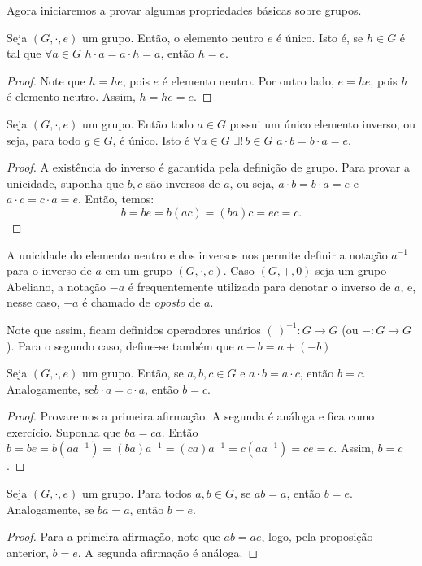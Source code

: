 Agora iniciaremos a provar algumas propriedades básicas sobre grupos.
\begin{prop}
    Seja $(G,\cdot,e)$ um grupo.
    Então, o elemento neutro $e$ é único.
    Isto é, se $h \in G$ é tal que $\forall a \in G$ $h \cdot a = a \cdot h = a$, então $h = e$.
\end{prop}
\begin{proof}
    Note que $h=he$, pois $e$ é elemento neutro.
    Por outro lado, $e=he$, pois $h$ é elemento neutro.
    Assim, $h=he=e$.
\end{proof}

\begin{prop}\label{prop:inverso_unico_grupo}
    Seja $(G,\cdot,e)$ um grupo.
    Então todo $a \in G$ possui um único elemento inverso, ou seja, para todo $g \in G$,  é único.
Isto é $\forall a \in G$ $\exists!\, b \in G$ $a \cdot b = b \cdot a = e$.
\end{prop}
\begin{proof}
    A existência do inverso é garantida pela definição de grupo.
    Para provar a unicidade, suponha que $b, c$ são inversos de $a$, ou seja, $a \cdot b = b \cdot a = e$ e $a \cdot c = c \cdot a = e$.
    Então, temos:
    $$b=be=b(ac)=(ba)c=ec=c.$$
\end{proof}

A unicidade do elemento neutro e dos inversos nos permite definir a notação $a^{-1}$ para o inverso de $a$ em um grupo $(G,\cdot,e)$.
Caso $(G, +, 0)$ seja um grupo Abeliano, a notação $-a$ é frequentemente utilizada para denotar o inverso de $a$, e, nesse caso, $-a$ é chamado de \emph{oposto} de $a$.

Note que assim, ficam definidos operadores unários $(\,)^{-1}:G\rightarrow G$ (ou $-:G\rightarrow G$).
Para o segundo caso, define-se também que $a-b=a+(-b)$.

\begin{prop}[Cancelamento]
    Seja $(G,\cdot,e)$ um grupo.
Então, se $a,b,c \in G$ e $a \cdot b = a \cdot c$, então $b=c$.
    Analogamente, se$b \cdot a = c \cdot a$, então $b=c$.
\end{prop}
\begin{proof}
Provaremos a primeira afirmação.
A segunda é análoga e fica como exercício.
    Suponha que $ba=ca$.
Então $b=be=b(aa^{-1})=(ba)a^{-1}=(ca)a^{-1}=c(aa^{-1})=ce=c$.
Assim, $b=c$.
\end{proof}

\begin{corol}[Cancelamento II]
    Seja $(G,\cdot,e)$ um grupo.
    Para todos $a, b \in G$, se $ab=a$, então $b=e$.
Analogamente, se $ba=a$, então $b=e$.
\end{corol}
\begin{proof}
    Para a primeira afirmação, note que $ab=ae$, logo, pela proposição anterior, $b=e$.
    A segunda afirmação é análoga.
\end{proof}

